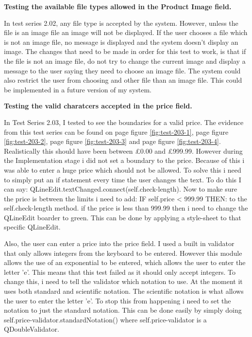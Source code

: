 \textbf{Testing the available file types allowed in the Product Image field.}

In test series 2.02, any file type is accepted by the system. However, unless the file is an image file an image will not be displayed. If the user chooses a file which is not an image file, no message is displayed and the system doesn't display an image. The changes that need to be made in order for this test to work, is that if the file is not an image file, do not try to change the current image and display a message to the user saying they need to choose an image file. The system could also restrict the user from choosing and other file than an image file. This could be implemented in a future version of my system.

\textbf{Testing the valid charatcers accepted in the price field.}

In Test Series 2.03, I tested to see the boundaries for a valid price. The evidence from this test series can be found on  page \pageref{fig:test-203-1} figure \ref{fig:test-203-1}, page \pageref{fig:test-203-2} figure \ref{fig:test-203-2}, page \pageref{fig:test-203-3} figure \ref{fig:test-203-3} and page \pageref{fig:test-203-4} figure \ref{fig:test-203-4}. Realistically this should have been between £0.00 and £999.99. However during the Implementation stage i did not set a boundary to the price. Because of this i was able to enter a huge price which should not be allowed. To solve this i need to simply put an if statement every time the user changes the text. To do this I can say: QLineEdit.textChanged.connect(self.check-length). Now to make sure the price is between the limits i need to add: IF self.price < 999.99 THEN: to the self.check-length method. if the price is less than 999.99 then i need to change the QLineEdit boarder to green. This can be done by applying a style-sheet to that specific QLineEdit.

Also, the user can enter a price into the price field. I used a built in validator that only allows integers from the keyboard to be entered. However this module allows the use of an exponential to be entered, which allows the user to enter the letter 'e'. This means that this test failed as it should only accept integers. To change this, i need to tell the validator which notation to use. At the moment it uses both standard and scientific notation. The scientific notation is what allows the user to enter the letter 'e'. To stop this from happening i need to set the notation to just the standard notation. This can be done easily by simply doing self.price-validator.standardNotation() where self.price-validator is a QDoubleValidator.


